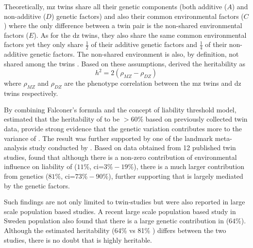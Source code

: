 \documentclass[12pt]{scrbook}
\newcommand*{\glng}{\glsentrylong}
\begin{document}
	Theoretically, \gls{mz} twins share all their genetic components (both additive ($A$) and non-additive ($D$) genetic factors) and also their common environmental factors ($C$) where the only difference between a twin pair is the non-shared environmental factors ($E$). 
	As for the \gls{dz} twins, they also share the same common environmental factors yet they only share $\frac{1}{2}$ of their additive genetic factors and $\frac{1}{4}$ of their non-additive genetic factors. 
	The non-shared environment is also, by definition, not shared among the twins \citep{Rijsdijk2002}.
	Based on these assumptions, \cite{Falconer1996} derived the heritability as
	\begin{equation}
	h^2 = 2(\rho_{MZ}-\rho_{DZ})
	\end{equation}
	where $\rho_{MZ}$ and $\rho_{DZ}$ are the phenotype correlation between the \gls{mz} twins and \gls{dz} twins respectively.
	
	By combining Falconer's formula and the concept of liability threshold model, \citet{Gottesman01071967} estimated that the heritability of \glng{scz} to be $>60\%$ based on previously collected twin data, provide strong evidence that the genetic variation contributes more to the variance of \glng{scz}.
	The result was further supported by one of the landmark meta-analysis study conducted by \citet{Sullivan2003}.
	Based on data obtained from 12 published \glng{scz} twin studies, \citet{Sullivan2003} found that although there is a non-zero contribution of environmental influence on liability of \glng{scz} ($11\%$, \gls{ci}=$3\%-19\%$), there is a much larger contribution from genetics ($81\%$, \gls{ci}=$73\%-90\%$), further supporting that \glng{scz} is largely mediated by the genetic factors.
	
	Such findings are not only limited to twin-studies but were also reported in large scale population based studies.
	A recent large scale population based study in Sweden population \citep{Lichtenstein2009} also found that there is a large genetic contribution in \glng{scz} ($64\%$).
	Although the estimated heritability (64\% \citep{Lichtenstein2009} vs 81\% \citep{Sullivan2003}) differs between the two studies, there is no doubt that \glng{scz} is highly heritable.
	
\end{document}
